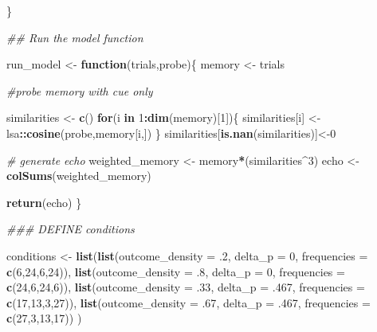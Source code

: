 \documentclass[
  english,
  man,floatsintext]{apa6}
\newenvironment{Shaded}{\begin{snugshade}}{\end{snugshade}}
\newcommand{\KeywordTok}[1]{\textcolor[rgb]{0.13,0.29,0.53}{\textbf{#1}}}
\newcommand{\DataTypeTok}[1]{\textcolor[rgb]{0.13,0.29,0.53}{#1}}
\newcommand{\DecValTok}[1]{\textcolor[rgb]{0.00,0.00,0.81}{#1}}
\newcommand{\FloatTok}[1]{\textcolor[rgb]{0.00,0.00,0.81}{#1}}
\newcommand{\StringTok}[1]{\textcolor[rgb]{0.31,0.60,0.02}{#1}}
\newcommand{\CommentTok}[1]{\textcolor[rgb]{0.56,0.35,0.01}{\textit{#1}}}
\newcommand{\ControlFlowTok}[1]{\textcolor[rgb]{0.13,0.29,0.53}{\textbf{#1}}}
\newcommand{\OperatorTok}[1]{\textcolor[rgb]{0.81,0.36,0.00}{\textbf{#1}}}
\newcommand{\NormalTok}[1]{#1}
\begin{document}
\begin{appendix}
\begin{Shaded}
\begin{Highlighting}[]
\NormalTok{\}}

\CommentTok{## Run the model function}

\NormalTok{run_model <-}\StringTok{ }\ControlFlowTok{function}\NormalTok{(trials,probe)\{}
\NormalTok{  memory <-}\StringTok{ }\NormalTok{trials}

\CommentTok{#probe memory with cue only}

\NormalTok{  similarities <-}\StringTok{ }\KeywordTok{c}\NormalTok{()}
\ControlFlowTok{for}\NormalTok{(i }\ControlFlowTok{in} \DecValTok{1}\OperatorTok{:}\KeywordTok{dim}\NormalTok{(memory)[}\DecValTok{1}\NormalTok{])\{}
\NormalTok{    similarities[i] <-}\StringTok{ }\NormalTok{lsa}\OperatorTok{::}\KeywordTok{cosine}\NormalTok{(probe,memory[i,])}
\NormalTok{  \}}
\NormalTok{  similarities[}\KeywordTok{is.nan}\NormalTok{(similarities)]<-}\DecValTok{0}

\CommentTok{# generate echo}
\NormalTok{  weighted_memory <-}\StringTok{ }\NormalTok{memory}\OperatorTok{*}\NormalTok{(similarities}\OperatorTok{^}\DecValTok{3}\NormalTok{)}
\NormalTok{  echo <-}\StringTok{ }\KeywordTok{colSums}\NormalTok{(weighted_memory)}

\KeywordTok{return}\NormalTok{(echo)}
\NormalTok{\}}

\CommentTok{### DEFINE conditions}

\NormalTok{conditions <-}\StringTok{ }\KeywordTok{list}\NormalTok{(}\KeywordTok{list}\NormalTok{(}\DataTypeTok{outcome_density =} \FloatTok{.2}\NormalTok{,}
\DataTypeTok{delta_p =} \DecValTok{0}\NormalTok{,}
\DataTypeTok{frequencies =} \KeywordTok{c}\NormalTok{(}\DecValTok{6}\NormalTok{,}\DecValTok{24}\NormalTok{,}\DecValTok{6}\NormalTok{,}\DecValTok{24}\NormalTok{)),}
\KeywordTok{list}\NormalTok{(}\DataTypeTok{outcome_density =} \FloatTok{.8}\NormalTok{,}
\DataTypeTok{delta_p =} \DecValTok{0}\NormalTok{,}
\DataTypeTok{frequencies =} \KeywordTok{c}\NormalTok{(}\DecValTok{24}\NormalTok{,}\DecValTok{6}\NormalTok{,}\DecValTok{24}\NormalTok{,}\DecValTok{6}\NormalTok{)),}
\KeywordTok{list}\NormalTok{(}\DataTypeTok{outcome_density =} \FloatTok{.33}\NormalTok{,}
\DataTypeTok{delta_p =} \FloatTok{.467}\NormalTok{,}
\DataTypeTok{frequencies =} \KeywordTok{c}\NormalTok{(}\DecValTok{17}\NormalTok{,}\DecValTok{13}\NormalTok{,}\DecValTok{3}\NormalTok{,}\DecValTok{27}\NormalTok{)),}
\KeywordTok{list}\NormalTok{(}\DataTypeTok{outcome_density =} \FloatTok{.67}\NormalTok{,}
\DataTypeTok{delta_p =} \FloatTok{.467}\NormalTok{,}
\DataTypeTok{frequencies =} \KeywordTok{c}\NormalTok{(}\DecValTok{27}\NormalTok{,}\DecValTok{3}\NormalTok{,}\DecValTok{13}\NormalTok{,}\DecValTok{17}\NormalTok{))}
\NormalTok{                   )}


\end{Highlighting}
\end{Shaded}
\end{appendix}
\end{document}
